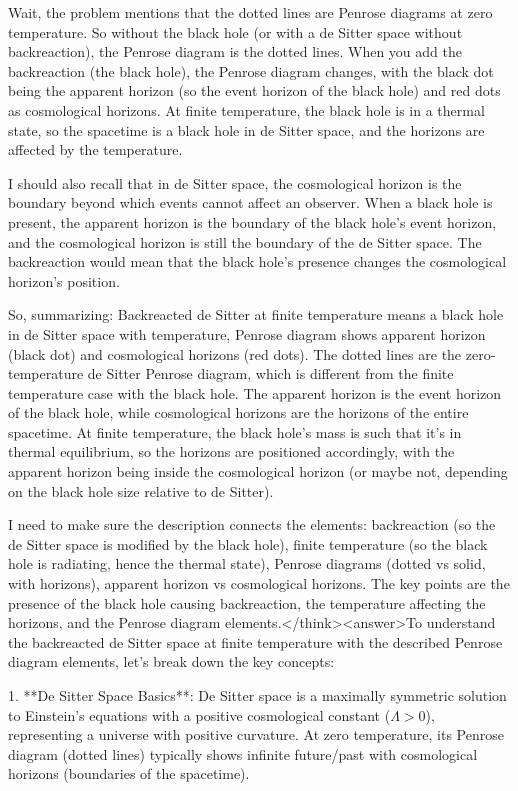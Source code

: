 Wait, the problem mentions that the dotted lines are Penrose diagrams at zero temperature. So without the black hole (or with a de Sitter space without backreaction), the Penrose diagram is the dotted lines. When you add the backreaction (the black hole), the Penrose diagram changes, with the black dot being the apparent horizon (so the event horizon of the black hole) and red dots as cosmological horizons. At finite temperature, the black hole is in a thermal state, so the spacetime is a black hole in de Sitter space, and the horizons are affected by the temperature.

I should also recall that in de Sitter space, the cosmological horizon is the boundary beyond which events cannot affect an observer. When a black hole is present, the apparent horizon is the boundary of the black hole's event horizon, and the cosmological horizon is still the boundary of the de Sitter space. The backreaction would mean that the black hole's presence changes the cosmological horizon's position.

So, summarizing: Backreacted de Sitter at finite temperature means a black hole in de Sitter space with temperature, Penrose diagram shows apparent horizon (black dot) and cosmological horizons (red dots). The dotted lines are the zero-temperature de Sitter Penrose diagram, which is different from the finite temperature case with the black hole. The apparent horizon is the event horizon of the black hole, while cosmological horizons are the horizons of the entire spacetime. At finite temperature, the black hole's mass is such that it's in thermal equilibrium, so the horizons are positioned accordingly, with the apparent horizon being inside the cosmological horizon (or maybe not, depending on the black hole size relative to de Sitter).

I need to make sure the description connects the elements: backreaction (so the de Sitter space is modified by the black hole), finite temperature (so the black hole is radiating, hence the thermal state), Penrose diagrams (dotted vs solid, with horizons), apparent horizon vs cosmological horizons. The key points are the presence of the black hole causing backreaction, the temperature affecting the horizons, and the Penrose diagram elements.</think><answer>To understand the backreacted de Sitter space at finite temperature with the described Penrose diagram elements, let’s break down the key concepts:  

1. **De Sitter Space Basics**: De Sitter space is a maximally symmetric solution to Einstein’s equations with a positive cosmological constant (\(\Lambda > 0\)), representing a universe with positive curvature. At zero temperature, its Penrose diagram (dotted lines) typically shows infinite future/past with cosmological horizons (boundaries of the spacetime).  

